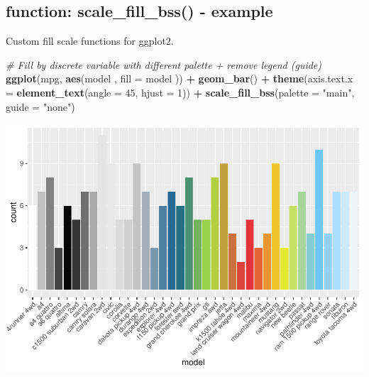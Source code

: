\documentclass[
]{article}
\newenvironment{Shaded}{\begin{snugshade}}{\end{snugshade}}
\newcommand{\CommentTok}[1]{\textcolor[rgb]{0.56,0.35,0.01}{\textit{#1}}}
\newcommand{\DataTypeTok}[1]{\textcolor[rgb]{0.13,0.29,0.53}{#1}}
\newcommand{\DecValTok}[1]{\textcolor[rgb]{0.00,0.00,0.81}{#1}}
\newcommand{\KeywordTok}[1]{\textcolor[rgb]{0.13,0.29,0.53}{\textbf{#1}}}
\newcommand{\NormalTok}[1]{#1}
\newcommand{\OperatorTok}[1]{\textcolor[rgb]{0.81,0.36,0.00}{\textbf{#1}}}
\newcommand{\StringTok}[1]{\textcolor[rgb]{0.31,0.60,0.02}{#1}}
\begin{document}
\hypertarget{function-scale_fill_bss---example}{%
\subsection{function: scale\_fill\_bss() -
example}\label{function-scale_fill_bss---example}}

Custom fill scale functions for ggplot2.

\begin{Shaded}
\begin{Highlighting}[]
\CommentTok{\# Fill by discrete variable with different palette + remove legend (guide)}
\KeywordTok{ggplot}\NormalTok{(mpg, }\KeywordTok{aes}\NormalTok{(model          , }\DataTypeTok{fill =}\NormalTok{ model         )) }\OperatorTok{+}
\StringTok{  }\KeywordTok{geom\_bar}\NormalTok{() }\OperatorTok{+}
\StringTok{  }\KeywordTok{theme}\NormalTok{(}\DataTypeTok{axis.text.x =} \KeywordTok{element\_text}\NormalTok{(}\DataTypeTok{angle =} \DecValTok{45}\NormalTok{, }\DataTypeTok{hjust =} \DecValTok{1}\NormalTok{)) }\OperatorTok{+}
\StringTok{  }\KeywordTok{scale\_fill\_bss}\NormalTok{(}\DataTypeTok{palette =} \StringTok{"main"}\NormalTok{, }\DataTypeTok{guide =} \StringTok{"none"}\NormalTok{)}
\end{Highlighting}
\end{Shaded}

\includegraphics[width=1\linewidth]{man/figures/README-scale_fill_bss-1}
\end{document}
